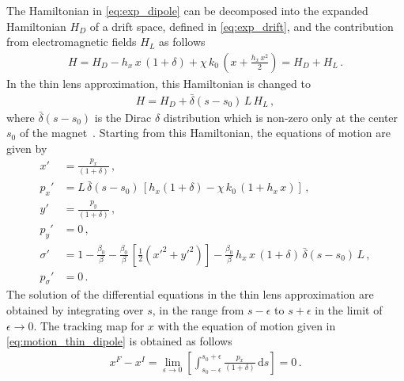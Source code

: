 \newpage
The Hamiltonian in \eqref{eq:exp_dipole} can be decomposed into the expanded Hamiltonian $H_D$ of a drift space, defined in \eqref{eq:exp_drift}, and the contribution from electromagnetic fields $H_L$ as follows
%
\begin{align}
  H = H_D - h_x \, x \, (1+\delta) + \chi \, k_0 \, \left(x + \frac{h_x \, x^2}{2} \right) = H_D + H_L \, .
\end{align}
%
In the thin lens approximation, this Hamiltonian is changed to~\cite{DESY-95-189}
%
\begin{align}
 H = H_D + \bar{\delta}(s-s_0) \, L \, H_L \, , \label{eq:thin_H}
\end{align}
%
where $\bar{\delta}(s-s_0)$ is the Dirac $\delta$ distribution which is non-zero only at the center $s_0$ of the magnet~\cite{dirac:1958}. 
%
Starting from this Hamiltonian, the equations of motion are given by
\begin{align}
  x'    &= \frac{p_x}{(1+\delta)} \, , \label{eq:motion_thin_dipole}\\
  p_x'  &= L \, \bar{\delta}(s-s_0) \, \left[ h_x (1+\delta) - \chi \, k_0 \, (1+h_x \, x)  \right] \, ,\\
  y'    &= \frac{p_y}{(1+\delta)} \, ,\\
  p_y'  &= 0 \, , \\
  \sigma' &= 1 - \frac{\beta_0}{\beta} - \frac{\beta_0}{\beta} \, \left[ \frac{1}{2} \left(x'^2 + y'^2\right) \right] - \frac{\beta_0}{\beta} \, h_x \, x \, (1+\delta) \, \bar{\delta}(s-s_0) \, L \, , \\
  p_\sigma ' &= 0 \, .
\end{align}
%
The solution of the differential equations in the thin lens approximation are obtained by integrating over $s$, in the range from $s-\epsilon$ to $s+\epsilon$ in the limit of $\epsilon \rightarrow 0$. The tracking map for $x$ with the equation of motion given in \eqref{eq:motion_thin_dipole} is obtained as follows
%
\begin{align}
  x^F - x^I = \lim_{\epsilon \rightarrow 0} \left[ \int_{s_0 - \epsilon}^{s_0+\epsilon} \frac{p_x}{(1+\delta)} \, \mathrm{d}s \right] = 0 \, .
\end{align}
%
%
%

%
%

